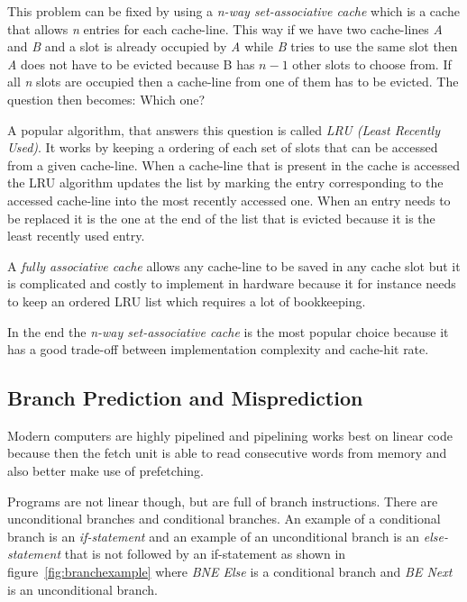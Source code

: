 This problem can be fixed by using a \textit{n-way set-associative cache} which is a cache that allows \textit{n} entries for each cache-line.
This way if we have two cache-lines \textit{A} and \textit{B} and a slot is already occupied by \textit{A} while \textit{B} tries to use the same slot then \textit{A} does not have to be evicted because B has $n-1$ other slots to choose from.
If all \textit{n} slots are occupied then a cache-line from one of them has to be evicted.
The question then becomes: Which one?

A popular algorithm, that answers this question is called \textit{LRU (Least Recently Used)}.
It works by keeping a ordering of each set of slots that can be accessed from a given cache-line. 
When a cache-line that is present in the cache is accessed the LRU algorithm updates the list by marking the entry corresponding to the accessed cache-line into the most recently accessed one.
When an entry needs to be replaced it is the one at the end of the list that is evicted because it is the least recently used entry.

A \textit{fully associative cache} allows any cache-line to be saved in any cache slot but it is complicated and costly to implement in hardware because it for instance needs to keep an ordered LRU list which requires a lot of bookkeeping.

In the end the \textit{n-way set-associative cache} is the most popular choice because it has a good trade-off between implementation complexity and cache-hit rate.


\subsection{Branch Prediction and Misprediction}
Modern computers are highly pipelined and pipelining works best on linear code because then the fetch unit is able to read consecutive words from memory and also better make use of prefetching.

Programs are not linear though, but are full of branch instructions. There are unconditional branches and conditional branches. 
An example of a conditional branch is an \textit{if-statement} and an example of an unconditional branch is an \textit{else-statement} that is not followed by an if-statement as shown in figure~\ref{fig:branchexample} where \textit{BNE Else} is a conditional branch and \textit{BE Next} is an unconditional branch. 

